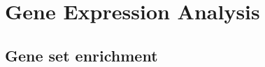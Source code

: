 \documentclass{thesisclass}
\begin{document}
%
%
%
%
%
%
%
%
%

\section{Gene Expression Analysis} \label{sec:gene_expression}

\subsection{Gene set enrichment}
\end{document}
